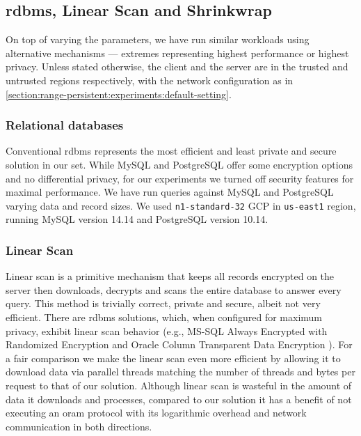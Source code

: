 	\subsection{\acrshort{rdbms}, Linear Scan and Shrinkwrap}

		On top of varying the parameters, we have run similar workloads using alternative mechanisms --- extremes representing highest performance or highest privacy.
		Unless stated otherwise, the client and the server are in the trusted and untrusted regions respectively, with the network configuration as in \cref{section:range-persistent:experiments:default-setting}.

		\subsubsection*{Relational databases}

			Conventional \acrshort{rdbms} represents the most efficient and least private and secure solution in our set.
			While MySQL and PostgreSQL offer some encryption options and no differential privacy, for our experiments we turned off security features for maximal performance.
			We have run queries against MySQL and PostgreSQL varying data and record sizes.
			We used \texttt{n1-standard-32} GCP  in \texttt{us-east1} region, running MySQL version 14.14 and PostgreSQL version 10.14.

		\subsubsection*{Linear Scan}

			Linear scan is a primitive mechanism that keeps all records encrypted on the server then downloads, decrypts and scans the entire database to answer every query.
			This method is trivially correct, private and secure, albeit not very efficient.
			There are \acrshort{rdbms} solutions, which, when configured for maximum privacy, exhibit linear scan behavior (e.g., MS-SQL Always Encrypted with Randomized Encryption \cite{mssql-always-enc} and Oracle Column Transparent Data Encryption \cite{oracle-tde}).
			For a fair comparison we make the linear scan even more efficient by allowing it to download data via parallel threads matching the number of threads and bytes per request to that of our solution.
			Although linear scan is wasteful in the amount of data it downloads and processes, compared to our solution it has a benefit of not executing an \acrshort{oram} protocol with its logarithmic overhead and network communication in both directions.

